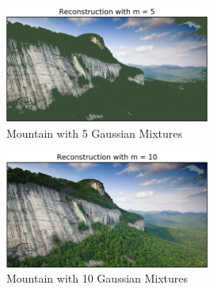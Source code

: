 \begin{figure}[H]
\centering
\includegraphics[width=0.6\textwidth]{./figures/self_tf_5.png}
\caption{\label{fig:self_tf_5} Mountain with 5 Gaussian Mixtures}
\end{figure}

\begin{figure}[H]
\centering
\includegraphics[width=0.6\textwidth]{./figures/self_tf_10.png}
\caption{\label{fig:self_tf_10} Mountain with 10 Gaussian Mixtures}
\end{figure}

\clearpage


